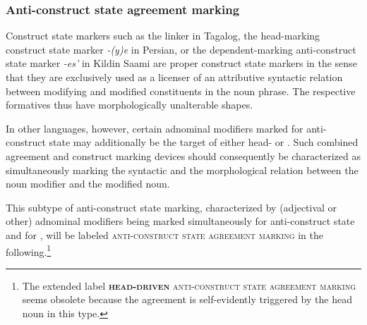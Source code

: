 \subsubsection{Anti\hyp{}construct state agreement marking}
\label{anti-constr agr}
Construct state markers such as the linker in Tagalog, the head-marking construct state marker \textit{-(y)e} in Persian, or the dependent\hyp{}marking anti\hyp{}construct state marker \textit{-es'} in Kildin Saami are proper construct state markers in the sense that they are exclusively used as a licenser of an attributive syntactic relation between modifying and modified constituents in the noun phrase. The respective formatives thus have morphologically unalterable shapes.

In other languages, however, certain adnominal modifiers marked for anti\hyp{}construct state may additionally be the target of either head- or . Such combined agreement and construct marking devices should consequently be characterized as simultaneously marking the syntactic and the morphological relation between the noun modifier and the modified noun. 

This subtype of anti\hyp{}construct state marking, characterized by (adjectival or other) adnominal modifiers being marked simultaneously for anti\hyp{}construct state and for , will be labeled \textsc{anti\hyp{}construct state agreement marking} in the following.\footnote{The extended label \textsc{\textbf{head\hyp{}driven} anti\hyp{}construct state agreement marking} seems obsolete because the agreement is self-evidently triggered by the head noun in this type.} %

